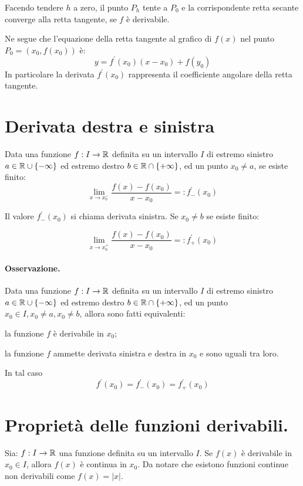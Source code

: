 Facendo tendere $h$ a zero, il punto $P_h$ tente a $P_0$ e la corrispondente retta secante converge alla retta tangente, se $f$ è derivabile.

Ne segue che l'equazione della retta tangente al grafico di $f(x)$ nel punto $P_0=(x_0,f(x_0))$ è:
\[y=f^\prime(x_0)(x-x_0)+f(y_0)\]
In particolare la derivata $f^\prime(x_0)$ rappresenta il coefficiente angolare della retta tangente. 

\section{Derivata destra e sinistra}
Data una funzione $f:I\rightarrow \mathbb{R}$ definita su un intervallo $I$ di estremo sinistro $a\in\mathbb{R}\cup \{-\infty\}$ ed estremo destro $b\in\mathbb{R}\cap \{+\infty\}$, ed un punto $x_0 \neq a$, se esiste finito:
\begin{equation*}
\lim_{x\to x_0^-}{\frac{f(x)-f(x_0)}{x-x_0}} =: f^\prime_-(x_0)
\end{equation*}

Il valore $f^\prime_-(x_0)$ si chiama derivata sinistra. Se $x_0\neq b$ se esiste finito:

\begin{equation*}
\lim_{x\to x_0^+}{\frac{f(x)-f(x_0)}{x-x_0}} =: f^\prime_+(x_0)
\end{equation*}

\paragraph{Osservazione.}
Data una funzione $f:I\rightarrow \mathbb{R}$ definita su un intervallo $I$ di estremo sinistro $a\in \mathbb{R} \cup \{-\infty\}$ ed estremo destro $b\in\mathbb{R}\cap \{+\infty\}$, ed un punto $x_0\in I, x_0 \neq a , x_0 \neq b$, allora sono fatti equivalenti:
\begin{aenumerate}
\item la funzione $f$ è derivabile in $x_0$;
\item la funzione $f$ ammette derivata sinistra e destra in $x_0$ e sono uguali tra loro.
\end{aenumerate}
In tal caso
\begin{equation*}
f^\prime(x_0)=f^\prime_-(x_0) = f^\prime_+(x_0)
\end{equation*}

\section{Proprietà delle funzioni derivabili.}
\begin{teo}
Sia: $f:I\rightarrow\mathbb{R}$ una funzione definita su un intervallo $I$. Se $f(x)$ è derivabile in $x_0\in I$, allora $f(x)$ è continua in $x_0$.
Da notare che esistono funzioni continue non derivabili come $f(x) = |x|$.
\end{teo}

